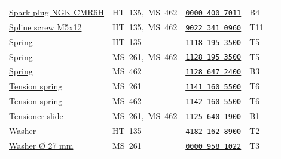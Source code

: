 \documentclass[10pt,letterpaper]{article}
\begin{document}
\begin{longtable}{@{}>{\raggedright\arraybackslash}p{3.18in}p{1.85in}p{1.30in}p{0.38in}r@{}}
\hyperlink{00004007011}{Spark plug NGK CMR6H} & \textcolor{frkApplication}{\mbox{HT 135, MS 462}} & \hyperlink{00004007011}{\texttt{0000 400 7011}} & B4 & \pageref{part-00004007011}\\

\rowcolor{black!6}\hyperlink{90223410960}{Spline screw M5x12} & \textcolor{frkApplication}{\mbox{HT 135, MS 462}} & \hyperlink{90223410960}{\texttt{9022 341 0960}} & T11 & \pageref{part-90223410960}\\

\hyperlink{11181953500}{Spring} & \textcolor{frkApplication}{\mbox{HT 135}} & \hyperlink{11181953500}{\texttt{1118 195 3500}} & T5 & \pageref{part-11181953500}\\

\rowcolor{black!6}\hyperlink{11281953500}{Spring} & \textcolor{frkApplication}{\mbox{MS 261, MS 462}} & \hyperlink{11281953500}{\texttt{1128 195 3500}} & T5 & \pageref{part-11281953500}\\

\hyperlink{11286472400}{Spring} & \textcolor{frkApplication}{\mbox{MS 462}} & \hyperlink{11286472400}{\texttt{1128 647 2400}} & B3 & \pageref{part-11286472400}\\

\rowcolor{black!6}\hyperlink{11411605500}{Tension spring} & \textcolor{frkApplication}{\mbox{MS 261}} & \hyperlink{11411605500}{\texttt{1141 160 5500}} & T6 & \pageref{part-11411605500}\\

\hyperlink{11421605500}{Tension spring} & \textcolor{frkApplication}{\mbox{MS 462}} & \hyperlink{11421605500}{\texttt{1142 160 5500}} & T6 & \pageref{part-11421605500}\\

\rowcolor{black!6}\hyperlink{11256401900}{Tensioner slide} & \textcolor{frkApplication}{\mbox{MS 261, MS 462}} & \hyperlink{11256401900}{\texttt{1125 640 1900}} & B1 & \pageref{part-11256401900}\\

\hyperlink{41821628900}{Washer} & \textcolor{frkApplication}{\mbox{HT 135}} & \hyperlink{41821628900}{\texttt{4182 162 8900}} & T2 & \pageref{part-41821628900}\\

\rowcolor{black!6}\hyperlink{00009581022}{Washer \O{} 27 mm} & \textcolor{frkApplication}{\mbox{MS 261}} & \hyperlink{00009581022}{\texttt{0000 958 1022}} & T3 & \pageref{part-00009581022}\\


\end{longtable}
\end{document}
